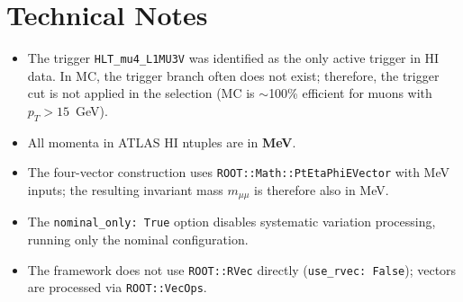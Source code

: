 \documentclass[12pt,a4paper]{article}
\begin{document}
\section{Technical Notes}

\begin{itemize}
    \item The trigger \texttt{HLT\_mu4\_L1MU3V} was identified as the only active trigger
          in HI data. In MC, the trigger branch often does not exist;
          therefore, the trigger cut is not applied in the selection (MC is $\sim$100\%
          efficient for muons with $p_T > 15$~GeV).
    \item All momenta in ATLAS HI ntuples are in \textbf{MeV}.
    \item The four-vector construction uses \texttt{ROOT::Math::PtEtaPhiEVector}
          with MeV inputs; the resulting invariant mass $m_{\mu\mu}$ is therefore
          also in MeV.
    \item The \texttt{nominal\_only: True} option disables systematic variation
          processing, running only the nominal configuration.
    \item The framework does not use \texttt{ROOT::RVec} directly
          (\texttt{use\_rvec: False}); vectors are processed via
          \texttt{ROOT::VecOps}.
\end{itemize}
\end{document}
